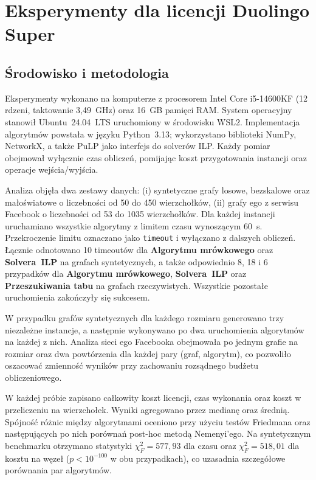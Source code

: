 \chapter{Eksperymenty dla licencji Duolingo Super}
\label{chap:experiments}

\section{Środowisko i metodologia}

Eksperymenty wykonano na komputerze z procesorem Intel Core i5-14600KF (12 rdzeni, taktowanie 3,49~GHz) oraz 16~GB pamięci RAM. System operacyjny stanowił Ubuntu~24.04~LTS uruchomiony w środowisku WSL2. Implementacja algorytmów powstała w języku Python~3.13; wykorzystano biblioteki NumPy, NetworkX, a także PuLP jako interfejs do solverów ILP. Każdy pomiar obejmował wyłącznie czas obliczeń, pomijając koszt przygotowania instancji oraz operacje wejścia/wyjścia.

Analiza objęła dwa zestawy danych: (i) syntetyczne grafy losowe, bezskalowe oraz małoświatowe o liczebności od 50 do 450 wierzchołków, (ii) grafy ego z serwisu Facebook o liczebności od 53 do 1035 wierzchołków. Dla każdej instancji uruchamiano wszystkie algorytmy z limitem czasu wynoszącym 60~s. Przekroczenie limitu oznaczano jako \texttt{timeout} i wyłączano z dalszych obliczeń. Łącznie odnotowano 10 timeoutów dla \textbf{Algorytmu mrówkowego} oraz \textbf{Solvera~ILP} na grafach syntetycznych, a także odpowiednio 8, 18 i 6 przypadków dla \textbf{Algorytmu mrówkowego}, \textbf{Solvera~ILP} oraz \textbf{Przeszukiwania tabu} na grafach rzeczywistych. Wszystkie pozostałe uruchomienia zakończyły się sukcesem.

W przypadku grafów syntetycznych dla każdego rozmiaru generowano trzy niezależne instancje, a następnie wykonywano po dwa uruchomienia algorytmów na każdej z nich. Analiza sieci ego Facebooka obejmowała po jednym grafie na rozmiar oraz dwa powtórzenia dla każdej pary (graf, algorytm), co pozwoliło oszacować zmienność wyników przy zachowaniu rozsądnego budżetu obliczeniowego.

W każdej próbie zapisano całkowity koszt licencji, czas wykonania oraz koszt w przeliczeniu na wierzchołek. Wyniki agregowano przez medianę oraz średnią. Spójność różnic między algorytmami oceniono przy użyciu testów Friedmana oraz następujących po nich porównań post-hoc metodą Nemenyi'ego. Na syntetycznym benchmarku otrzymano statystyki $\chi^2_F = 577{,}93$ dla czasu oraz $\chi^2_F = 518{,}01$ dla kosztu na węzeł ($p < 10^{-100}$ w obu przypadkach), co uzasadnia szczegółowe porównania par algorytmów.

